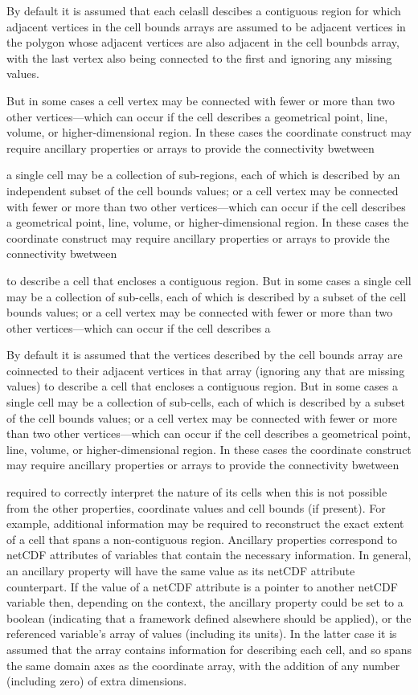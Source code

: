 By default it is assumed that each celasll descibes a contiguous region
for which adjacent vertices in the cell bounds arrays are assumed to
be adjacent vertices in the polygon whose adjacent vertices are also adjacent in the
cell bounbds array, with the last vertex also being connected to the
first and ignoring any missing values.

But in some cases a cell vertex may be connected with fewer or more
than two other vertices---which can occur if the cell describes a
geometrical point, line, volume, or higher-dimensional region. In
these cases the coordinate construct may require ancillary properties
or arrays to provide the connectivity bwetween

a single cell may be a collection of sub-regions,
each of which is described by an independent subset of the cell bounds
values; or a cell vertex may be connected with fewer or more than two
other vertices---which can occur if the cell describes a geometrical
point, line, volume, or higher-dimensional region. In these cases the
coordinate construct may require ancillary properties or arrays to
provide the connectivity bwetween



to describe a cell that encloses a contiguous
region. But in some cases a single cell may be a collection of
sub-cells, each of which is described by a subset of the cell bounds
values; or a cell vertex may be connected with fewer or more than two
other vertices---which can occur if the cell describes a


By default it is assumed that the vertices described by the cell
bounds array are coinnected to their adjacent vertices in that array
(ignoring any that are missing values) to describe a cell that
encloses a contiguous region. But in some cases a single cell may be a
collection of sub-cells, each of which is described by a subset of the
cell bounds values; or a cell vertex may be connected with fewer or
more than two other vertices---which can occur if the cell describes a
geometrical point, line, volume, or higher-dimensional region. In
these cases the coordinate construct may require ancillary properties
or arrays to provide the connectivity bwetween 



required to correctly interpret the nature of
its cells when this is not possible from the other properties,
coordinate values and cell bounds (if present). For example,
additional information may be required to reconstruct the exact extent
of a cell that spans a non-contiguous region. Ancillary properties
correspond to netCDF attributes of variables that contain the
necessary information. In general, an ancillary property will have the
same value as its netCDF attribute counterpart. If the value of a
netCDF attribute is a pointer to another netCDF variable then,
depending on the context, the ancillary property could be set to a
boolean (indicating that a framework defined alsewhere should be
applied), or the referenced variable's array of values (including its
units). In the latter case it is assumed that the array contains
information for describing each cell, and so spans the same domain
axes as the coordinate array, with the addition of any number
(including zero) of extra dimensions.

